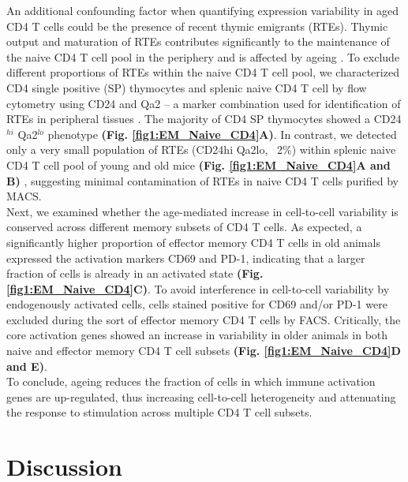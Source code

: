 An additional confounding factor when quantifying expression variability in aged CD4\plus{} T cells could be the presence of recent thymic emigrants (RTEs). Thymic output and maturation of RTEs contributes significantly to the maintenance of the naive CD4\plus{} T cell pool in the periphery and is affected by ageing \citep{Boursalian2004, Hale2006, Fink2013}. To exclude different proportions of RTEs within the naive CD4\plus{} T cell pool, we characterized CD4 single positive (SP) thymocytes and splenic naive CD4\plus{} T cell by flow cytometry using CD24 and Qa2 – a marker combination used for identification of RTEs in peripheral tissues \citep{Boursalian2004, Hale2006}. The majority of CD4 SP thymocytes showed a CD24$^{hi}$ Qa2$^{lo}$ phenotype \textbf{(Fig. \ref{fig1:EM_Naive_CD4}A)}. In contrast, we detected only a very small population of RTEs (CD24hi Qa2lo, ~2\%) within splenic naive CD4\plus{} T cell pool of young and old mice \textbf{(Fig. \ref{fig1:EM_Naive_CD4}A and B)} \citep{Hale2006}, suggesting minimal contamination of RTEs in naive CD4\plus{} T cells purified by MACS.\\

Next, we examined whether the age-mediated increase in cell-to-cell variability is conserved across different memory subsets of CD4\plus{} T cells. As expected, a significantly higher proportion of effector memory CD4\plus{} T cells in old animals expressed the activation markers CD69 and PD-1, indicating that a larger fraction of cells is already in an activated state \textbf{(Fig. \ref{fig1:EM_Naive_CD4}C)}. To avoid interference in cell-to-cell variability by endogenously activated cells, cells stained positive for CD69 and/or PD-1 were excluded during the sort of effector memory CD4\plus{} T cells by FACS. Critically, the core activation genes showed an increase in variability in older animals in both naive and effector memory CD4\plus{} T cell subsets \textbf{(Fig. \ref{fig1:EM_Naive_CD4}D and E)}.\\

To conclude, ageing reduces the fraction of cells in which immune activation genes are up-regulated, thus increasing cell-to-cell heterogeneity and attenuating the response to stimulation across multiple CD4\plus{} T cell subsets.

\newpage

\section{Discussion}

